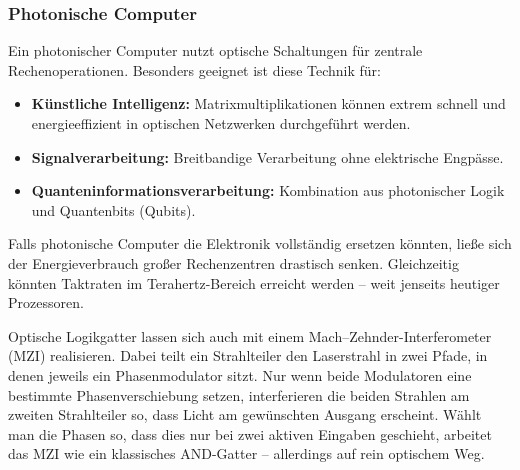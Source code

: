\subsubsection{Photonische Computer}

Ein photonischer Computer nutzt optische Schaltungen für zentrale Rechenoperationen. Besonders geeignet ist diese Technik für:
\begin{itemize}
	\item \textbf{Künstliche Intelligenz:} Matrixmultiplikationen können extrem schnell und energieeffizient in optischen Netzwerken durchgeführt werden.
	\item \textbf{Signalverarbeitung:} Breitbandige Verarbeitung ohne elektrische Engpässe.
	\item \textbf{Quanteninformationsverarbeitung:} Kombination aus photonischer Logik und Quantenbits (Qubits).
\end{itemize}
\vspace{1em}
\begin{tcolorbox}[hypobox, title={Was wäre, wenn optische Computer Elektronik ablösen?}]
	\label{box:optlogik_zukunft}
	\small
	Falls photonische Computer die Elektronik vollständig ersetzen könnten, ließe sich der Energieverbrauch großer Rechenzentren drastisch senken. Gleichzeitig könnten Taktraten im Terahertz-Bereich erreicht werden – weit jenseits heutiger Prozessoren.
\end{tcolorbox}
Optische Logikgatter lassen sich auch mit einem Mach–Zehnder-Interferometer (MZI) realisieren. 
Dabei teilt ein Strahlteiler den Laserstrahl in zwei Pfade, in denen jeweils ein Phasenmodulator sitzt. 
Nur wenn beide Modulatoren eine bestimmte Phasenverschiebung setzen, interferieren die beiden Strahlen am zweiten Strahlteiler so, dass Licht am gewünschten Ausgang erscheint. 
Wählt man die Phasen so, dass dies nur bei zwei aktiven Eingaben geschieht, arbeitet das MZI wie ein klassisches \textsc{AND}-Gatter – allerdings auf rein optischem Weg. 
\vspace{1em}

